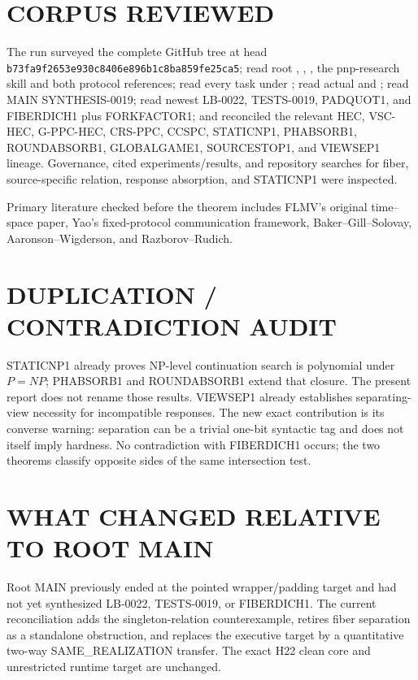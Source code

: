 \documentclass[11pt]{article}
\begin{document}
\section{CORPUS REVIEWED}

The run surveyed the complete GitHub tree at head
\texttt{b73fa9f2653e930c8406e896b1c8ba859fe25ca5}; read root
, , , the pnp-research skill and
both protocol references; read every task under ; read actual
 and ; read MAIN SYNTHESIS-0019; read newest
LB-0022, TESTS-0019, PADQUOT1, and FIBERDICH1 plus FORKFACTOR1; and reconciled
the relevant HEC, VSC-HEC, G-PPC-HEC, CRS-PPC, CCSPC, STATICNP1, PHABSORB1,
ROUNDABSORB1, GLOBALGAME1, SOURCESTOP1, and VIEWSEP1 lineage.  Governance,
cited experiments/results, and repository searches for fiber, source-specific
relation, response absorption, and STATICNP1 were inspected.

Primary literature checked before the theorem includes FLMV's original
time--space paper, Yao's fixed-protocol communication framework,
Baker--Gill--Solovay, Aaronson--Wigderson, and Razborov--Rudich.

\section{DUPLICATION / CONTRADICTION AUDIT}

STATICNP1 already proves NP-level continuation search is polynomial under
$P=NP$; PHABSORB1 and ROUNDABSORB1 extend that closure.  The present report
does not rename those results.  VIEWSEP1 already establishes separating-view
necessity for incompatible responses.  The new exact contribution is its
converse warning: separation can be a trivial one-bit syntactic tag and does
not itself imply hardness.  No contradiction with FIBERDICH1 occurs; the two
theorems classify opposite sides of the same intersection test.

\section{WHAT CHANGED RELATIVE TO ROOT MAIN}

Root MAIN previously ended at the pointed wrapper/padding target and had not
yet synthesized LB-0022, TESTS-0019, or FIBERDICH1.  The current reconciliation
adds the singleton-relation counterexample, retires fiber separation as a
standalone obstruction, and replaces the executive target by a quantitative
two-way SAME\_REALIZATION transfer.  The exact H22 clean core and unrestricted
runtime target are unchanged.
\end{document}
